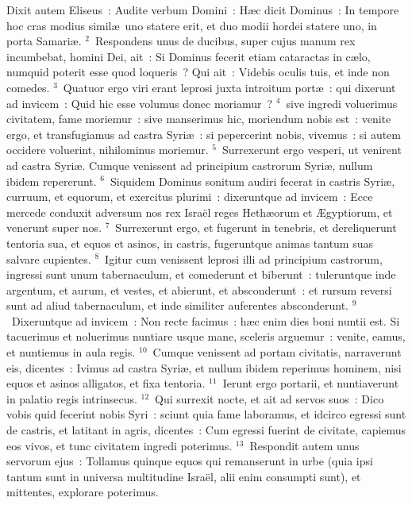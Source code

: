 \lettrine[lines=10,image=true,loversize=0.05,lraise=-0.03]{D}{}ixit autem Eliseus~: Audite verbum Domini~: H\ae c dicit Dominus~: In tempore hoc cras modius simil\ae\ uno statere erit, et duo modii hordei statere uno, in porta Samari\ae .
${}^{2}$~Respondens unus de ducibus, super cujus manum rex incumbebat, homini Dei, ait~: Si Dominus fecerit etiam cataractas in c\ae lo, numquid poterit esse quod loqueris~? Qui ait~: Videbis oculis tuis, et inde non comedes.
${}^{3}$~Quatuor ergo viri erant leprosi juxta introitum port\ae~: qui dixerunt ad invicem~: Quid hic esse volumus donec moriamur~?
${}^{4}$~sive ingredi voluerimus civitatem, fame moriemur~: sive manserimus hic, moriendum nobis est~: venite ergo, et transfugiamus ad castra Syri\ae~: si pepercerint nobis, vivemus~: si autem occidere voluerint, nihilominus moriemur.
${}^{5}$~Surrexerunt ergo vesperi, ut venirent ad castra Syri\ae . Cumque venissent ad principium castrorum Syri\ae , nullum ibidem repererunt.
${}^{6}$~Siquidem Dominus sonitum audiri fecerat in castris Syri\ae , curruum, et equorum, et exercitus plurimi~: dixeruntque ad invicem~: Ecce mercede conduxit adversum nos rex Isra\"el reges Heth\ae orum et \AE gyptiorum, et venerunt super nos.
${}^{7}$~Surrexerunt ergo, et fugerunt in tenebris, et dereliquerunt tentoria sua, et equos et asinos, in castris, fugeruntque animas tantum suas salvare cupientes.
${}^{8}$~Igitur cum venissent leprosi illi ad principium castrorum, ingressi sunt unum tabernaculum, et comederunt et biberunt~: tuleruntque inde argentum, et aurum, et vestes, et abierunt, et absconderunt~: et rursum reversi sunt ad aliud tabernaculum, et inde similiter auferentes absconderunt.
${}^{9}$~Dixeruntque ad invicem~: Non recte facimus~: h\ae c enim dies boni nuntii est. Si tacuerimus et noluerimus nuntiare usque mane, sceleris arguemur~: venite, eamus, et nuntiemus in aula regis.
${}^{10}$~Cumque venissent ad portam civitatis, narraverunt eis, dicentes~: Ivimus ad castra Syri\ae , et nullum ibidem reperimus hominem, nisi equos et asinos alligatos, et fixa tentoria.
${}^{11}$~Ierunt ergo portarii, et nuntiaverunt in palatio regis intrinsecus.
${}^{12}$~Qui surrexit nocte, et ait ad servos suos~: Dico vobis quid fecerint nobis Syri~: sciunt quia fame laboramus, et idcirco egressi sunt de castris, et latitant in agris, dicentes~: Cum egressi fuerint de civitate, capiemus eos vivos, et tunc civitatem ingredi poterimus.
${}^{13}$~Respondit autem unus servorum ejus~: Tollamus quinque equos qui remanserunt in urbe (quia ipsi tantum sunt in universa multitudine Isra\"el, alii enim consumpti sunt), et mittentes, explorare poterimus.
